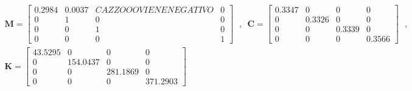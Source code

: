 \documentclass[a4paper,12pt,oneside]{article}
\begin{document}
\[ \begin{split}
	\mathbf{M} =	\begin{bmatrix}
										0.2984	& 0.0037	& CAZZOOO VIENE NEGATIVO	& 0 \\
										0	& 1	& 0	& 0 \\
										0	& 0	& 1	& 0 \\
										0	& 0	& 0	& 1
									\end{bmatrix} \text{~ , ~}
		\mathbf{C} =	\begin{bmatrix}
											0.3347	& 0				& 0				& 0 \\
											0				& 0.3326	& 0				& 0 \\
											0				& 0				& 0.3339	& 0 \\
											0				& 0				& 0				& 0.3566
										\end{bmatrix} \text{~ , ~} \\[10pt]
	\mathbf{K} =	\begin{bmatrix}
										43.5295	& 0					& 0					& 0 \\
										0				& 154.0437	& 0					& 0 \\
										0				& 0					& 281.1869	& 0 \\
										0				& 0					& 0					& 371.2903
									\end{bmatrix}
\end{split} \]
\end{document}
